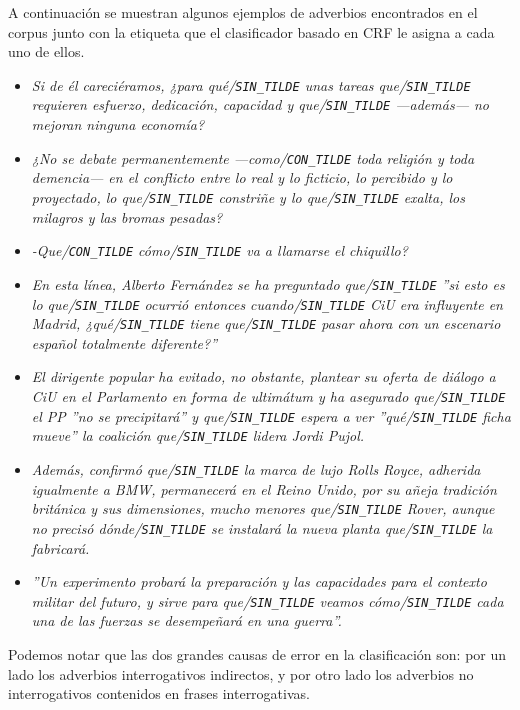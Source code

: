 \documentclass[runningheads,a4paper]{llncs}
\begin{document}
A continuación se muestran algunos ejemplos de adverbios encontrados en el corpus junto con la etiqueta que el clasificador basado en CRF le asigna a cada uno de ellos.
\begin{itemize}
\item{\emph{Si de él careciéramos, ¿para qu\'e/\texttt{\small SIN\_TILDE} unas tareas que/\texttt{\small SIN\_TILDE} requieren esfuerzo, dedicación, capacidad y que/\texttt{\small SIN\_TILDE} ---además--- no mejoran ninguna economía?}}

\item{\emph{¿No se debate permanentemente ---como/\texttt{\small CON\_TILDE} toda religión y toda de\-men\-cia--- en el conflicto entre lo real y lo ficticio, lo percibido y lo proyectado, lo que/\texttt{\small SIN\_TILDE} constriñe y lo que/\texttt{\small SIN\_TILDE} exalta, los milagros y las bromas pesadas?}}

\item{\emph{-Que/\texttt{\small CON\_TILDE} cómo/\texttt{\small SIN\_TILDE} va a llamarse el chiquillo?}}

\item{\emph{En esta línea, Alberto Fernández se ha preguntado que/\texttt{\small SIN\_TILDE} ''si esto es lo que/\texttt{\small SIN\_TILDE} ocurrió entonces cuando/\texttt{\small SIN\_TILDE} CiU era influyente en Madrid, ¿qu\'e/\texttt{\small SIN\_TILDE} tiene que/\texttt{\small SIN\_TILDE} pasar ahora con un escenario español totalmente diferente?''}}

\item{\emph{El dirigente popular ha evitado, no obstante, plantear su oferta de diálogo a CiU en el Parlamento en forma de ultimátum y ha asegurado que/\texttt{\small SIN\_TILDE} el PP ''no se precipitará'' y que/\texttt{\small SIN\_TILDE} espera a ver ''qué/\texttt{\small SIN\_TILDE} ficha mueve'' la coalición que/\texttt{\small SIN\_TILDE} lidera Jordi Pujol.}} 

\item{\emph{Además, confirmó que/\texttt{\small SIN\_TILDE} la marca de lujo Rolls Royce, adherida igualmente a BMW, permanecerá en el Reino Unido, por su añeja tradición británica y sus dimensiones, mucho menores que/\texttt{\small SIN\_TILDE} Rover, aunque no precisó d\'onde/\texttt{\small SIN\_TILDE} se instalará la nueva planta que/\texttt{\small SIN\_TILDE} la fabricará.}}

\item{\emph{''Un experimento probará la preparación y las capacidades para el contexto militar del futuro, y sirve para que/\texttt{\small SIN\_TILDE} veamos c\'omo/\texttt{\small SIN\_TILDE} cada una de las fuerzas se desempeñará en una guerra''. }}

\end{itemize}
Podemos notar que las dos grandes causas de error en la clasificación son: por un lado los adverbios interrogativos indirectos, y por otro lado los adverbios no interrogativos contenidos en frases interrogativas.
\end{document}
